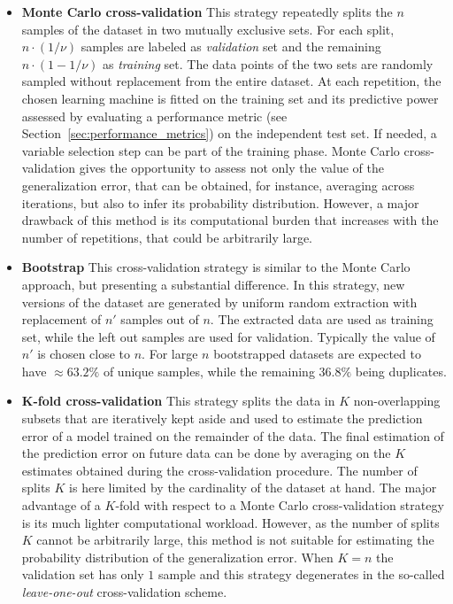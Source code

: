   \begin{itemize}
  	\item[] \textbf{Monte Carlo cross-validation}
  	This strategy repeatedly splits the $n$ samples of the dataset in two mutually exclusive sets. For each split, $n\cdot(1/\nu)$ samples are labeled as \textit{validation} set and the remaining $n\cdot(1 - 1/\nu)$ as \textit{training} set. The data points of the two sets are randomly sampled without replacement from the entire dataset.
  	At each repetition, the chosen learning machine
  	is fitted on the training set and its predictive power assessed by evaluating a performance metric (see Section~\ref{sec:performance_metrics}) on the independent test set. If needed, a variable selection step can be part of the training phase. Monte Carlo cross-validation gives the opportunity to assess not only the value of the generalization error, that can be obtained, for instance, averaging across iterations, but also to infer its probability distribution. However, a major drawback of this method is its computational burden that increases with the number of repetitions, that could be arbitrarily large.
  	
  	\item[] \textbf{Bootstrap} This cross-validation strategy is similar to the Monte Carlo approach, but presenting a substantial difference. In this strategy, new versions of the dataset are generated by uniform random extraction with replacement of $n'$ samples out of $n$.
  	The extracted data are used as training set, while the left out samples are used for validation.
  	Typically the value of $n'$ is chosen close to $n$. For large $n$ bootstrapped datasets are expected to have $\approx 63.2\%$ of unique samples, while the remaining $36.8\%$ being duplicates.
  	
  	\item[] \textbf{$\bm{K}$-fold cross-validation}
    This strategy splits the data in $K$ non-overlapping subsets that are iteratively kept aside and used to estimate the prediction error of a model trained on the remainder of the data. The final estimation of the prediction error on future data can be done by averaging on the $K$ estimates obtained during the cross-validation procedure. The number of splits $K$ is here limited by the cardinality of the dataset at hand. The major advantage of a $K$-fold with respect to a Monte Carlo cross-validation strategy is its much lighter computational workload. However, as the number of splits $K$ cannot be arbitrarily large, this method is not suitable for estimating the probability distribution of the generalization error.
    When $K=n$ the validation set has only $1$ sample and this strategy degenerates in the so-called \textit{leave-one-out} cross-validation scheme.
  \end{itemize}

